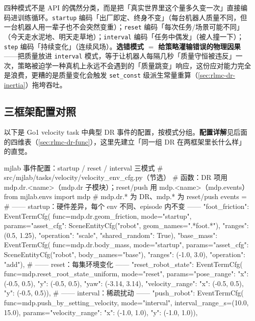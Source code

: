 \begin{insight}[模式 $=$ 把「变化频率」编码进训练]\label{ins:rlmc-dr-mode-physics}
四种模式不是 API 的偶然分类，而是把「真实世界里这个量多久变一次」直接编码进训练循环。\verb|startup| 编码「出厂即定、终身不变」（每台机器人质量不同，但一台机器人用一辈子也不会突然变重）；\verb|reset| 编码「每次任务/场景可能不同」（今天走水泥地、明天走草地）；\verb|interval| 编码「任务中偶发」（被人撞一下）；\verb|step| 编码「持续变化」（连续风场）。\textbf{选错模式 $=$ 给策略灌输错误的物理因果}——把质量放进 \verb|interval| 模式，等于让机器人每隔几秒「质量守恒被违反」一次，策略被迫学一种真机上永远不会遇到的「质量跳变」响应，这份应对能力完全是浪费，更糟的是质量变化会触发 \verb|set_const| 级派生常量重算（\cref{sec:rlmc-dr-inertia}）拖垮吞吐。
\end{insight}

\subsection{三框架配置对照}
\label{sec:rlmc-dr-mode-config}

以下是 Go1 velocity task 中典型 DR 事件的配置，按模式分组。\textbf{配置详解}见后面的四维表（\cref{sec:rlmc-dr-func}），这里先建立「同一组 DR 在两框架里长什么样」的直觉。

\begin{codebox}[Python]{mjlab 事件配置：startup / reset / interval 三模式}
# src/mjlab/tasks/velocity/velocity_env_cfg.py（节选）
# 函数：DR 项用 mdp.dr.<name>（mdp.dr 子模块）；reset/push 用 mdp.<name>（mdp.events）
from mjlab.envs import mdp                    # mdp.dr.* 为 DR、mdp.* 为 reset/push
events = {
    # —— startup：硬件差异，每个 env 不同、episode 内不变 ——
    "foot_friction": EventTermCfg(
        func=mdp.dr.geom_friction, mode="startup",
        params={"asset_cfg": SceneEntityCfg("robot", geom_names=".*foot.*"),
                "ranges": (0.5, 1.25), "operation": "scale", "shared_random": True}),
    "base_mass": EventTermCfg(
        func=mdp.dr.body_mass, mode="startup",
        params={"asset_cfg": SceneEntityCfg("robot", body_names="base"),
                "ranges": (-1.0, 3.0), "operation": "add"}),
    # —— reset：每集环境变化 ——
    "reset_robot_state": EventTermCfg(
        func=mdp.reset_root_state_uniform, mode="reset",
        params={"pose_range": {"x": (-0.5, 0.5), "y": (-0.5, 0.5),
                               "yaw": (-3.14, 3.14)},
                "velocity_range": {"x": (-0.5, 0.5), "y": (-0.5, 0.5)}}),
    # —— interval：稀疏扰动 ——
    "push_robot": EventTermCfg(
        func=mdp.push_by_setting_velocity, mode="interval",
        interval_range_s=(10.0, 15.0),
        params={"velocity_range": {"x": (-1.0, 1.0), "y": (-1.0, 1.0)}}),
}
\end{codebox}


